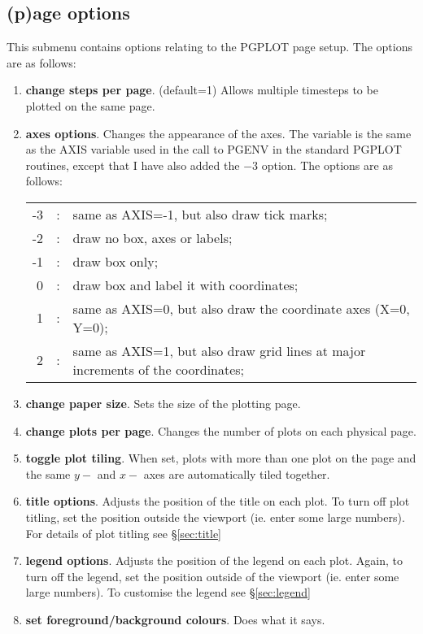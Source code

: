 \documentclass[a4paper,12pt]{article}
\begin{document}
\subsection{(p)age options}
\label{sec:optionspage}
 This submenu contains options relating to the PGPLOT page setup. The options are as follows:
\begin{enumerate}
\item \textbf{change steps per page}. (default=1) Allows multiple timesteps to be plotted on
the same page.
\item \textbf{axes options}. Changes the appearance of the axes. The variable is
the same as the AXIS variable used in the call to PGENV in the standard PGPLOT
routines, except that I have also added the $-3$ option. The options are
as follows:

\begin{tabular}{rcp{}}
-3 & : & same as AXIS=-1, but also draw tick marks; \\
 -2 & : & draw no box, axes or labels; \\
 -1 & : & draw box only; \\
  0 & : & draw box and label it with coordinates; \\
  1 & : & same as AXIS=0, but also draw the coordinate axes (X=0, Y=0); \\
  2 & : & same as AXIS=1, but also draw grid lines at major increments of the coordinates;
\end{tabular}

\item \textbf{change paper size}. Sets the size of the plotting page.
\item \textbf{change plots per page}. Changes the number of plots on each
physical page.
\item \textbf{toggle plot tiling}. When set, plots with more than one plot on
the page and the same $y-$ and $x-$ axes are automatically tiled together.
\item \textbf{title options}. Adjusts the position of the title on
each plot. To turn off plot titling, set the position outside the viewport (ie.
enter some large numbers). For details of plot titling see \S\vref{sec:title}
\item \textbf{legend options}. Adjusts the position of the legend on
each plot. Again, to turn off the legend, set the position outside of the
viewport (ie. enter some large numbers). To customise the legend see
\S\vref{sec:legend}
\item \textbf{set foreground/background colours}. Does what it says.
\end{enumerate}
\end{document}
